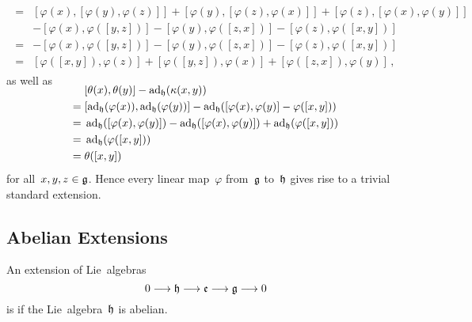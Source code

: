 \begin{fluff}
\begin{gather*}
\begin{aligned}
			\\
			={}&
			[ \varphi(x), [\varphi(y), \varphi(z)] ]
			+ [ \varphi(y), [\varphi(z), \varphi(x)] ]
			+ [ \varphi(z), [\varphi(x), \varphi(y)] ]
			\\
			{}&
			- [ \varphi(x), \varphi([y,z]) ]
			- [ \varphi(y), \varphi([z,x]) ]
			- [ \varphi(z), \varphi([x,y]) ]
			\\
			={}&
			- [ \varphi(x), \varphi([y,z]) ]
			- [ \varphi(y), \varphi([z,x]) ]
			- [ \varphi(z), \varphi([x,y]) ]
			\\
			={}&
			[ \varphi([x,y]), \varphi(z) ]
			+ [ \varphi([y,z]), \varphi(x) ]
			+ [ \varphi([z,x]), \varphi(y) ] \,,
		\end{aligned}
	\end{gather*}
	as well as
	\begin{align*}
		\SwapAboveDisplaySkip
		{}&
		[\theta(x), \theta(y)] - \ad_{\hlie}( \kappa(x,y) )
		\\
		={}&
		[ \ad_{\hlie}(\varphi(x)), \ad_{\hlie}(\varphi(y)) ] - \ad_{\hlie}( [\varphi(x), \varphi(y)] - \varphi([x,y]) )
		\\
		={}&
		\ad_{\hlie}( [\varphi(x), \varphi(y)] ) - \ad_{\hlie}( [\varphi(x), \varphi(y)] ) + \ad_{\hlie}( \varphi([x,y]) )
		\\
		={}&
		\ad_{\hlie}( \varphi([x,y]) )
		\\
		={}&
		\theta([x,y])
	\end{align*}
	for all~$x, y, z \in \mathfrak{g}$.
	Hence every linear map~$\varphi$ from~$\mathfrak{g}$ to~$\mathfrak{h}$ gives rise to a trivial standard extension.
\end{fluff}



\subsection{Abelian Extensions}

\begin{definition}
	An extension of Lie~algebras
	\[
		0 \to \hlie \to \elie \to \glie \to 0
	\]
	is  if the Lie~algebra~$\mathfrak{h}$ is abelian.
\end{definition}


